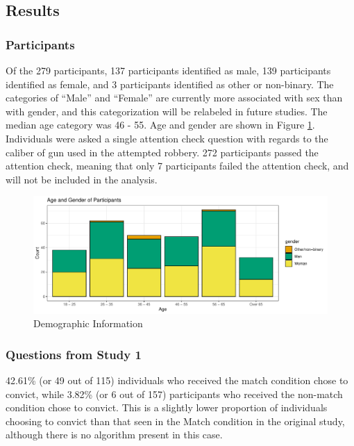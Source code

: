 \documentclass[print]{nuthesis}
\begin{document}
\hypertarget{results-2}{%
\subsection{Results}\label{results-2}}

\hypertarget{participants-1}{%
\subsubsection{Participants}\label{participants-1}}

Of the 279 participants, 137 participants identified as male, 139 participants identified as female, and 3 participants identified as other or non-binary.
The categories of ``Male'' and ``Female'' are currently more associated with sex than with gender, and this categorization will be relabeled in future studies.
The median age category was 46 - 55.
Age and gender are shown in Figure \ref{fig:demographics2}.
Individuals were asked a single attention check question with regards to the caliber of gun used in the attempted robbery.
272 participants passed the attention check, meaning that only 7 participants failed the attention check, and will not be included in the analysis.

\begin{figure}

{\centering \includegraphics[width=\linewidth]{thesis_files/figure-latex/demographics2-1} 

}

\caption{Demographic Information}\label{fig:demographics2}
\end{figure}

\hypertarget{questions-from-study-1}{%
\subsubsection{Questions from Study 1}\label{questions-from-study-1}}

42.61\% (or 49 out of 115) individuals who received the match condition chose to convict, while 3.82\% (or 6 out of 157) participants who received the non-match condition chose to convict.
This is a slightly lower proportion of individuals choosing to convict than that seen in the Match condition in the original study, although there is no algorithm present in this case.
\end{document}
